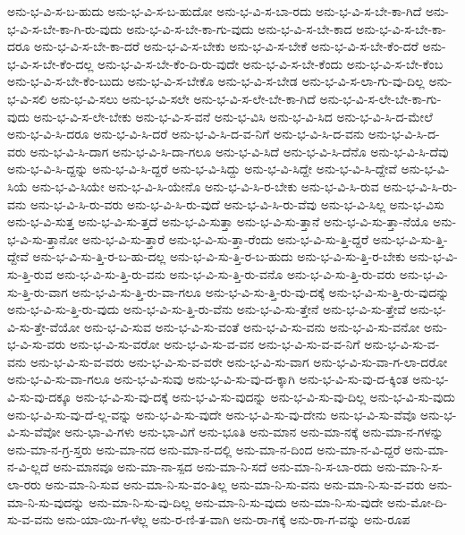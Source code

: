 {ಅನು-ಭ-ವಿ-ಸ-ಬ-ಹುದು
ಅನು-ಭ-ವಿ-ಸ-ಬ-ಹುದೋ
ಅನು-ಭ-ವಿ-ಸ-ಬಾ-ರದು
ಅನು-ಭ-ವಿ-ಸ-ಬೇ-ಕಾ-ಗಿದೆ
ಅನು-ಭ-ವಿ-ಸ-ಬೇ-ಕಾ-ಗಿ-ರು-ವುದು
ಅನು-ಭ-ವಿ-ಸ-ಬೇ-ಕಾ-ಗು-ವುದು
ಅನು-ಭ-ವಿ-ಸ-ಬೇ-ಕಾದ
ಅನು-ಭ-ವಿ-ಸ-ಬೇ-ಕಾ-ದರೂ
ಅನು-ಭ-ವಿ-ಸ-ಬೇ-ಕಾ-ದರೆ
ಅನು-ಭ-ವಿ-ಸ-ಬೇಕು
ಅನು-ಭ-ವಿ-ಸ-ಬೇಕೆ
ಅನು-ಭ-ವಿ-ಸ-ಬೇ-ಕೆಂ-ದರೆ
ಅನು-ಭ-ವಿ-ಸ-ಬೇ-ಕೆಂ-ದಲ್ಲ
ಅನು-ಭ-ವಿ-ಸ-ಬೇ-ಕೆಂ-ದಿ-ರು-ವುದೇ
ಅನು-ಭ-ವಿ-ಸ-ಬೇ-ಕೆಂದು
ಅನು-ಭ-ವಿ-ಸ-ಬೇ-ಕೆಂಬ
ಅನು-ಭ-ವಿ-ಸ-ಬೇ-ಕೆಂ-ಬುದು
ಅನು-ಭ-ವಿ-ಸ-ಬೇಕೊ
ಅನು-ಭ-ವಿ-ಸ-ಬೇಡ
ಅನು-ಭ-ವಿ-ಸ-ಲಾ-ಗು-ವು-ದಿಲ್ಲ
ಅನು-ಭ-ವಿ-ಸಲಿ
ಅನು-ಭ-ವಿ-ಸಲು
ಅನು-ಭ-ವಿ-ಸಲೇ
ಅನು-ಭ-ವಿ-ಸ-ಲೇ-ಬೇ-ಕಾ-ಗಿದೆ
ಅನು-ಭ-ವಿ-ಸ-ಲೇ-ಬೇ-ಕಾ-ಗು-ವುದು
ಅನು-ಭ-ವಿ-ಸ-ಲೇ-ಬೇಕು
ಅನು-ಭ-ವಿ-ಸ-ವನೆ
ಅನು-ಭ-ವಿಸಿ
ಅನು-ಭ-ವಿ-ಸಿದ
ಅನು-ಭ-ವಿ-ಸಿ-ದ-ಮೇಲೆ
ಅನು-ಭ-ವಿ-ಸಿ-ದರೂ
ಅನು-ಭ-ವಿ-ಸಿ-ದರೆ
ಅನು-ಭ-ವಿ-ಸಿ-ದ-ವ-ನಿಗೆ
ಅನು-ಭ-ವಿ-ಸಿ-ದ-ವನು
ಅನು-ಭ-ವಿ-ಸಿ-ದ-ವರು
ಅನು-ಭ-ವಿ-ಸಿ-ದಾಗ
ಅನು-ಭ-ವಿ-ಸಿ-ದಾ-ಗಲೂ
ಅನು-ಭ-ವಿ-ಸಿದೆ
ಅನು-ಭ-ವಿ-ಸಿ-ದೆನೊ
ಅನು-ಭ-ವಿ-ಸಿ-ದೆವು
ಅನು-ಭ-ವಿ-ಸಿ-ದ್ದನ್ನು
ಅನು-ಭ-ವಿ-ಸಿ-ದ್ದರೆ
ಅನು-ಭ-ವಿ-ಸಿದ್ದು
ಅನು-ಭ-ವಿ-ಸಿದ್ದೇ
ಅನು-ಭ-ವಿ-ಸಿ-ದ್ದೇವೆ
ಅನು-ಭ-ವಿ-ಸಿಯೆ
ಅನು-ಭ-ವಿ-ಸಿಯೇ
ಅನು-ಭ-ವಿ-ಸಿ-ಯೇನೊ
ಅನು-ಭ-ವಿ-ಸಿ-ರ-ಬೇಕು
ಅನು-ಭ-ವಿ-ಸಿ-ರುವ
ಅನು-ಭ-ವಿ-ಸಿ-ರು-ವನು
ಅನು-ಭ-ವಿ-ಸಿ-ರು-ವರು
ಅನು-ಭ-ವಿ-ಸಿ-ರು-ವುದೆ
ಅನು-ಭ-ವಿ-ಸಿ-ರು-ವೆವು
ಅನು-ಭ-ವಿ-ಸಿಲ್ಲ
ಅನು-ಭ-ವಿಸು
ಅನು-ಭ-ವಿ-ಸುತ್ತ
ಅನು-ಭ-ವಿ-ಸು-ತ್ತದೆ
ಅನು-ಭ-ವಿ-ಸುತ್ತಾ
ಅನು-ಭ-ವಿ-ಸು-ತ್ತಾನೆ
ಅನು-ಭ-ವಿ-ಸು-ತ್ತಾ-ನೆಯೊ
ಅನು-ಭ-ವಿ-ಸು-ತ್ತಾನೋ
ಅನು-ಭ-ವಿ-ಸು-ತ್ತಾರೆ
ಅನು-ಭ-ವಿ-ಸು-ತ್ತಾ-ರೆಂದು
ಅನು-ಭ-ವಿ-ಸು-ತ್ತಿ-ದ್ದರೆ
ಅನು-ಭ-ವಿ-ಸು-ತ್ತಿ-ದ್ದೇವೆ
ಅನು-ಭ-ವಿ-ಸು-ತ್ತಿ-ರ-ಬ-ಹು-ದಲ್ಲ
ಅನು-ಭ-ವಿ-ಸು-ತ್ತಿ-ರ-ಬ-ಹುದು
ಅನು-ಭ-ವಿ-ಸು-ತ್ತಿ-ರ-ಬೇಕು
ಅನು-ಭ-ವಿ-ಸು-ತ್ತಿ-ರುವ
ಅನು-ಭ-ವಿ-ಸು-ತ್ತಿ-ರು-ವನು
ಅನು-ಭ-ವಿ-ಸು-ತ್ತಿ-ರು-ವನೊ
ಅನು-ಭ-ವಿ-ಸು-ತ್ತಿ-ರು-ವರು
ಅನು-ಭ-ವಿ-ಸು-ತ್ತಿ-ರು-ವಾಗ
ಅನು-ಭ-ವಿ-ಸು-ತ್ತಿ-ರು-ವಾ-ಗಲೂ
ಅನು-ಭ-ವಿ-ಸು-ತ್ತಿ-ರು-ವು-ದಕ್ಕೆ
ಅನು-ಭ-ವಿ-ಸು-ತ್ತಿ-ರು-ವುದನ್ನು
ಅನು-ಭ-ವಿ-ಸು-ತ್ತಿ-ರು-ವುದು
ಅನು-ಭ-ವಿ-ಸು-ತ್ತಿ-ರು-ವೆನು
ಅನು-ಭ-ವಿ-ಸು-ತ್ತೇನೆ
ಅನು-ಭ-ವಿ-ಸು-ತ್ತೇವೆ
ಅನು-ಭ-ವಿ-ಸು-ತ್ತೇ-ವೆಯೋ
ಅನು-ಭ-ವಿ-ಸುವ
ಅನು-ಭ-ವಿ-ಸು-ವಂತೆ
ಅನು-ಭ-ವಿ-ಸು-ವನು
ಅನು-ಭ-ವಿ-ಸು-ವನೋ
ಅನು-ಭ-ವಿ-ಸು-ವರು
ಅನು-ಭ-ವಿ-ಸು-ವರೋ
ಅನು-ಭ-ವಿ-ಸು-ವ-ವನ
ಅನು-ಭ-ವಿ-ಸು-ವ-ವ-ನಿಗೆ
ಅನು-ಭ-ವಿ-ಸು-ವ-ವನು
ಅನು-ಭ-ವಿ-ಸು-ವ-ವರು
ಅನು-ಭ-ವಿ-ಸು-ವ-ವರೇ
ಅನು-ಭ-ವಿ-ಸು-ವಾಗ
ಅನು-ಭ-ವಿ-ಸು-ವಾ-ಗ-ಲಾ-ದರೋ
ಅನು-ಭ-ವಿ-ಸು-ವಾ-ಗಲೂ
ಅನು-ಭ-ವಿ-ಸುವು
ಅನು-ಭ-ವಿ-ಸು-ವು-ದ-ಕ್ಕಾಗಿ
ಅನು-ಭ-ವಿ-ಸು-ವು-ದ-ಕ್ಕಿಂತ
ಅನು-ಭ-ವಿ-ಸು-ವು-ದಕ್ಕೂ
ಅನು-ಭ-ವಿ-ಸು-ವು-ದಕ್ಕೆ
ಅನು-ಭ-ವಿ-ಸು-ವುದನ್ನು
ಅನು-ಭ-ವಿ-ಸು-ವು-ದಿಲ್ಲ
ಅನು-ಭ-ವಿ-ಸು-ವುದು
ಅನು-ಭ-ವಿ-ಸು-ವು-ದೆ-ಲ್ಲ-ವನ್ನು
ಅನು-ಭ-ವಿ-ಸು-ವುದೇ
ಅನು-ಭ-ವಿ-ಸು-ವು-ದೇನು
ಅನು-ಭ-ವಿ-ಸು-ವೆವೊ
ಅನು-ಭ-ವಿ-ಸು-ವೆವೋ
ಅನು-ಭಾ-ವಿ-ಗಳು
ಅನು-ಭಾ-ವಿಗೆ
ಅನು-ಭೂತಿ
ಅನು-ಮಾನ
ಅನು-ಮಾ-ನಕ್ಕೆ
ಅನು-ಮಾ-ನ-ಗಳನ್ನು
ಅನು-ಮಾ-ನ-ಗ್ರ-ಸ್ತರು
ಅನು-ಮಾ-ನದ
ಅನು-ಮಾ-ನ-ದಲ್ಲಿ
ಅನು-ಮಾ-ನ-ದಿಂದ
ಅನು-ಮಾ-ನ-ವಿ-ದ್ದರೆ
ಅನು-ಮಾ-ನ-ವಿ-ಲ್ಲದೆ
ಅನು-ಮಾನವೂ
ಅನು-ಮಾ-ನಾ-ಸ್ಪದ
ಅನು-ಮಾ-ನಿ-ಸದೆ
ಅನು-ಮಾ-ನಿ-ಸ-ಬಾ-ರದು
ಅನು-ಮಾ-ನಿ-ಸ-ಲಾ-ರರು
ಅನು-ಮಾ-ನಿ-ಸುವ
ಅನು-ಮಾ-ನಿ-ಸು-ವಂ-ತಿಲ್ಲ
ಅನು-ಮಾ-ನಿ-ಸು-ವನು
ಅನು-ಮಾ-ನಿ-ಸು-ವ-ವರು
ಅನು-ಮಾ-ನಿ-ಸು-ವುದನ್ನು
ಅನು-ಮಾ-ನಿ-ಸು-ವು-ದಿಲ್ಲ
ಅನು-ಮಾ-ನಿ-ಸು-ವುದು
ಅನು-ಮಾ-ನಿ-ಸು-ವುದೇ
ಅನು-ಮೋ-ದಿ-ಸು-ವ-ವನು
ಅನು-ಯಾ-ಯಿ-ಗ-ಳೆಲ್ಲ
ಅನು-ರ-ಣಿ-ತ-ವಾಗಿ
ಅನು-ರಾ-ಗಕ್ಕೆ
ಅನು-ರಾ-ಗ-ವನ್ನು
ಅನು-ರೂಪ
}
